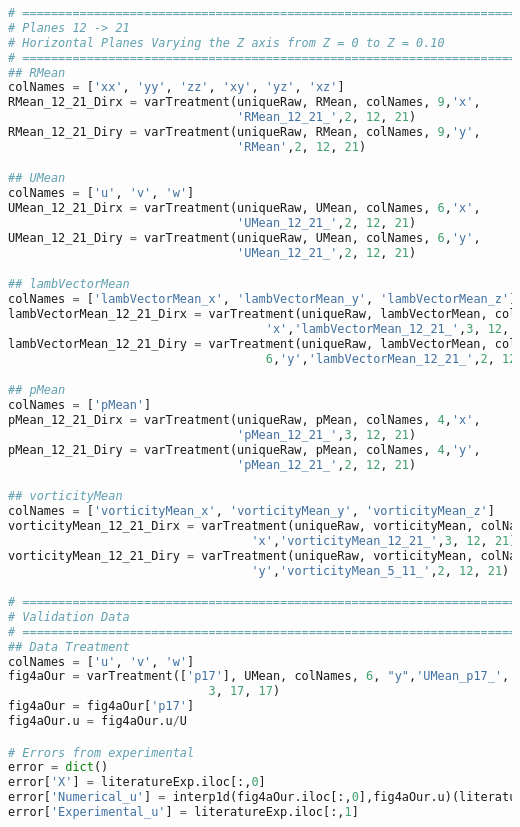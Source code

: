 \begin{lstlisting}[language=python]
# =============================================================================
# Planes 12 -> 21
# Horizontal Planes Varying the Z axis from Z = 0 to Z = 0.10
# =============================================================================
## RMean
colNames = ['xx', 'yy', 'zz', 'xy', 'yz', 'xz']
RMean_12_21_Dirx = varTreatment(uniqueRaw, RMean, colNames, 9,'x',
                                'RMean_12_21_',2, 12, 21)
RMean_12_21_Diry = varTreatment(uniqueRaw, RMean, colNames, 9,'y',
                                'RMean',2, 12, 21)

## UMean
colNames = ['u', 'v', 'w']
UMean_12_21_Dirx = varTreatment(uniqueRaw, UMean, colNames, 6,'x',
                                'UMean_12_21_',2, 12, 21)
UMean_12_21_Diry = varTreatment(uniqueRaw, UMean, colNames, 6,'y',
                                'UMean_12_21_',2, 12, 21)

## lambVectorMean
colNames = ['lambVectorMean_x', 'lambVectorMean_y', 'lambVectorMean_z']
lambVectorMean_12_21_Dirx = varTreatment(uniqueRaw, lambVectorMean, colNames, 6,
                                    'x','lambVectorMean_12_21_',3, 12, 21)
lambVectorMean_12_21_Diry = varTreatment(uniqueRaw, lambVectorMean, colNames,
                                    6,'y','lambVectorMean_12_21_',2, 12, 21)

## pMean
colNames = ['pMean']
pMean_12_21_Dirx = varTreatment(uniqueRaw, pMean, colNames, 4,'x',
                                'pMean_12_21_',3, 12, 21)
pMean_12_21_Diry = varTreatment(uniqueRaw, pMean, colNames, 4,'y',
                                'pMean_12_21_',2, 12, 21)

## vorticityMean
colNames = ['vorticityMean_x', 'vorticityMean_y', 'vorticityMean_z']
vorticityMean_12_21_Dirx = varTreatment(uniqueRaw, vorticityMean, colNames, 6,
                                  'x','vorticityMean_12_21_',3, 12, 21)
vorticityMean_12_21_Diry = varTreatment(uniqueRaw, vorticityMean, colNames, 6,
                                  'y','vorticityMean_5_11_',2, 12, 21)

# =============================================================================
# Validation Data
# =============================================================================
## Data Treatment
colNames = ['u', 'v', 'w']
fig4aOur = varTreatment(['p17'], UMean, colNames, 6, "y",'UMean_p17_',
                            3, 17, 17)
fig4aOur = fig4aOur['p17']
fig4aOur.u = fig4aOur.u/U

# Errors from experimental
error = dict()
error['X'] = literatureExp.iloc[:,0]
error['Numerical_u'] = interp1d(fig4aOur.iloc[:,0],fig4aOur.u)(literatureExp.iloc[:,0])
error['Experimental_u'] = literatureExp.iloc[:,1]


\end{lstlisting}
